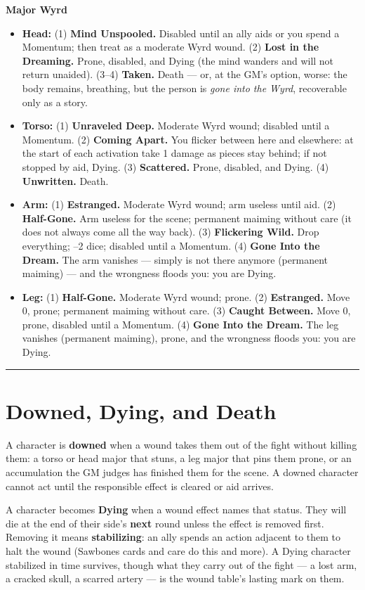 \textbf{Major Wyrd}
\begin{itemize}
    \item \textbf{Head:} (1) \textbf{Mind Unspooled.} Disabled until an ally aids or you spend a Momentum; then treat as a moderate Wyrd wound. (2) \textbf{Lost in the Dreaming.} Prone, disabled, and Dying (the mind wanders and will not return unaided). (3--4) \textbf{Taken.} Death --- or, at the GM's option, worse: the body remains, breathing, but the person is \textit{gone into the Wyrd}, recoverable only as a story.
    \item \textbf{Torso:} (1) \textbf{Unraveled Deep.} Moderate Wyrd wound; disabled until a Momentum. (2) \textbf{Coming Apart.} You flicker between here and elsewhere: at the start of each activation take 1 damage as pieces stay behind; if not stopped by aid, Dying. (3) \textbf{Scattered.} Prone, disabled, and Dying. (4) \textbf{Unwritten.} Death.
    \item \textbf{Arm:} (1) \textbf{Estranged.} Moderate Wyrd wound; arm useless until aid. (2) \textbf{Half-Gone.} Arm useless for the scene; permanent maiming without care (it does not always come all the way back). (3) \textbf{Flickering Wild.} Drop everything; --2 dice; disabled until a Momentum. (4) \textbf{Gone Into the Dream.} The arm vanishes --- simply is not there anymore (permanent maiming) --- and the wrongness floods you: you are Dying.
    \item \textbf{Leg:} (1) \textbf{Half-Gone.} Moderate Wyrd wound; prone. (2) \textbf{Estranged.} Move 0, prone; permanent maiming without care. (3) \textbf{Caught Between.} Move 0, prone, disabled until a Momentum. (4) \textbf{Gone Into the Dream.} The leg vanishes (permanent maiming), prone, and the wrongness floods you: you are Dying.
\end{itemize}

\medskip\hrule\medskip

\section{Downed, Dying, and Death}

A character is \textbf{downed} when a wound takes them out of the fight without killing them: a torso or head major that stuns, a leg major that pins them prone, or an accumulation the GM judges has finished them for the scene. A downed character cannot act until the responsible effect is cleared or aid arrives.

A character becomes \textbf{Dying} when a wound effect names that status. They will die at the end of their side's \textbf{next} round unless the effect is removed first. Removing it means \textbf{stabilizing}: an ally spends an action adjacent to them to halt the wound (Sawbones cards and care do this and more). A Dying character stabilized in time survives, though what they carry out of the fight --- a lost arm, a cracked skull, a scarred artery --- is the wound table's lasting mark on them.

